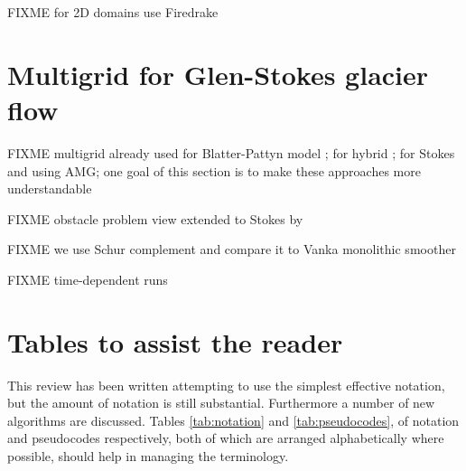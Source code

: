 \documentclass[letterpaper,final,12pt,reqno]{amsart}
\theoremstyle{claim}
\numberwithin{equation}{section}
\numberwithin{figure}{section}
\numberwithin{table}{section}
\numberwithin{theorem}{section}
\begin{document}
FIXME for 2D domains use Firedrake


\section{Multigrid for Glen-Stokes glacier flow} \label{sec:stokes}

FIXME multigrid already used for Blatter-Pattyn model \cite{BrownSmithAhmadia2013}; for hybrid \cite{Jouvetetal2013,JouvetGraeser2013}; for Stokes \cite{IsaacStadlerGhattas2015} and \cite{Tuminaroetal2016} using AMG; one goal of this section is to make these approaches more understandable

FIXME obstacle problem view extended to Stokes by \cite{WirbelJarosch2020}

FIXME we use Schur complement \cite{Bueler2021,Elmanetal2014} and compare it to Vanka monolithic smoother \cite{Farrelletal2019}

FIXME time-dependent runs


\small

\bigskip



\normalsize

\appendix

\section{Tables to assist the reader}

This review has been written attempting to use the simplest effective notation, but the amount of notation is still substantial.  Furthermore a number of new algorithms are discussed.  Tables \ref{tab:notation} and \ref{tab:pseudocodes}, of notation and pseudocodes respectively, both of which are arranged alphabetically where possible, should help in managing the terminology.
\end{document}
